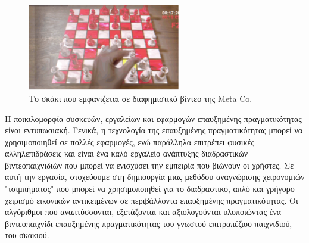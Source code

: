 \begin{figure}[H]
    \centering
    \includegraphics[width=0.6\textwidth]{Files/Figures/meta.png}
    \caption[Το σκάκι που εμφανίζεται σε διαφημιστικό βίντεο της Meta Co.]{Το σκάκι που εμφανίζεται σε διαφημιστικό βίντεο της Meta Co.}
    \label{fig:meta}
\end{figure}





Η ποικιλομορφία συσκευών, εργαλείων και εφαρμογών επαυξημένης πραγματικότητας είναι εντυπωσιακή. Γενικά, η τεχνολογία της επαυξημένης πραγματικότητας μπορεί να χρησιμοποιηθεί σε πολλές εφαρμογές, ενώ παράλληλα επιτρέπει φυσικές αλληλεπιδράσεις και είναι ένα καλό εργαλείο ανάπτυξης διαδραστικών βιντεοπαιχνιδιών που μπορεί να ενισχύσει την εμπειρία που βιώνουν οι χρήστες. Σε αυτή την εργασία, στοχεύουμε στη δημιουργία μιας μεθόδου αναγνώρισης χειρονομιών "τσιμπήματος" που μπορεί να χρησιμοποιηθεί για το διαδραστικό, απλό και γρήγορο χειρισμό εικονικών αντικειμένων σε περιβάλλοντα επαυξημένης πραγματικότητας. Οι αλγόριθμοι που αναπτύσσονται, εξετάζονται και αξιολογούνται υλοποιώντας ένα βιντεοπαιχνίδι επαυξημένης πραγματικότητας του γνωστού επιτραπέζιου παιχνιδιού, του σκακιού.